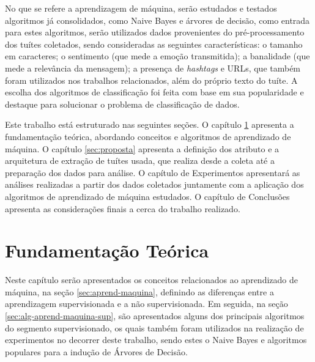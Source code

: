 \documentclass[oneside,openright,12pt]{ufsm_2015} %
\begin{document}
{    \par No que se refere a aprendizagem de máquina, serão estudados e testados algoritmos já consolidados, como Naive Bayes e árvores de decisão, como entrada para estes algoritmos, serão utilizados dados provenientes do pré-processamento dos tuítes coletados, sendo consideradas as seguintes características: o tamanho em caracteres; o sentimento (que mede a emoção transmitida); a banalidade (que mede a relevância da mensagem); a presença de \textit{hashtags} e URLs, que também foram utilizados nos trabalhos relacionados, além do próprio texto do tuíte. A escolha dos algoritmos de classificação foi feita com base em sua popularidade e destaque para solucionar o problema de classificação de dados.

    \par Este trabalho está estruturado nas seguintes seções. O capítulo \ref{sec:fund-teorica} apresenta a fundamentação teórica, abordando conceitos e algoritmos de aprendizado de máquina. O capítulo \ref{sec:proposta} apresenta a definição dos atributo e a arquitetura de extração de tuítes usada, que realiza desde a coleta até a preparação dos dados para análise. O capítulo de Experimentos apresentará as análises realizadas a partir dos dados coletados juntamente com a aplicação dos algoritmos de aprendizado de máquina estudados. O capítulo de Conclusões apresenta as considerações finais a cerca do trabalho realizado.


}
\geraintro  %


\chapter{Fundamentação Teórica}
\label{sec:fund-teorica}

    \par Neste capítulo serão apresentados os conceitos relacionados ao aprendizado de máquina, na seção \ref{sec:aprend-maquina}, definindo as diferenças entre a aprendizagem supervisionada e a não supervisionada. Em seguida, na seção \ref{sec:alg-aprend-maquina-sup}, são apresentados alguns dos principais algoritmos do segmento supervisionado, os quais também foram utilizados na realização de experimentos no decorrer deste trabalho, sendo estes o Naive Bayes e algoritmos populares para a indução de Árvores de Decisão.
\end{document}

